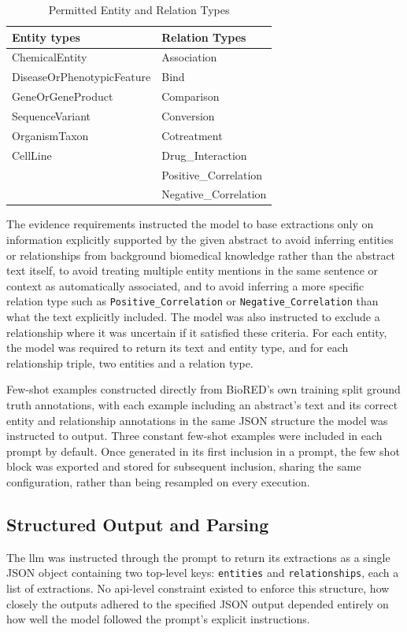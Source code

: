 \begin{table}[H]
    \centering
    \caption{Permitted Entity and Relation Types}
    \label{tab:permitted_entity_and_relation_types}
    \begin{tabularx}{\textwidth}{l l}
        \toprule
        Entity types & Relation Types \\
        \midrule
        ChemicalEntity & Association \\
        DiseaseOrPhenotypicFeature & Bind \\
        GeneOrGeneProduct & Comparison \\
        SequenceVariant & Conversion \\
        OrganismTaxon & Cotreatment \\
        CellLine & Drug\_Interaction \\
         & Positive\_Correlation \\
         & Negative\_Correlation \\
        \bottomrule
    \end{tabularx}
\end{table}

The evidence requirements instructed the model to base extractions only on information explicitly supported by the given abstract to avoid inferring entities or relationships from background biomedical knowledge rather than the abstract text itself, to avoid treating multiple entity mentions in the same sentence or context as automatically associated, and to avoid inferring a more specific relation type such as \verb|Positive_Correlation| or \verb|Negative_Correlation| than what the text explicitly included. The model was also instructed to exclude a relationship where it was uncertain if it satisfied these criteria. For each entity, the model was required to return its text and entity type, and for each relationship triple, two entities and a relation type.

Few-shot examples constructed directly from BioRED's own training split ground truth annotations, with each example including an abstract's text and its correct entity and relationship annotations in the same JSON structure the model was instructed to output. Three constant few-shot examples were included in each prompt by default. Once generated in its first inclusion in a prompt, the few shot block was exported and stored for subsequent inclusion, sharing the same configuration, rather than being resampled on every execution.

\subsection{Structured Output and Parsing}
\label{subsec:meth:structured_output_and_parsing}
The \gls{llm} was instructed through the prompt to return its extractions as a single JSON object containing two top-level keys: \texttt{entities} and \texttt{relationships}, each a list of extractions. No \gls{api}-level constraint existed to enforce this structure, how closely the outputs adhered to the specified JSON output depended entirely on how well the model followed the prompt's explicit instructions.


